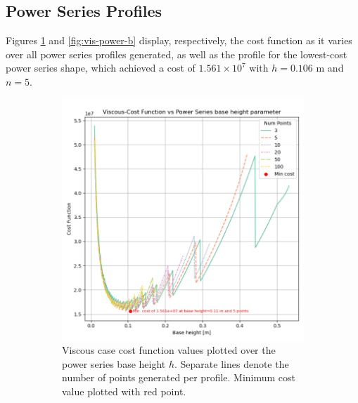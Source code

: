 \documentclass[11pt]{article}
\begin{document}
\subsection{Power Series Profiles}
Figures \ref{fig:vis-power-a} and \ref{fig:vis-power-b} display, respectively, the cost function as it varies over all power series profiles generated, as well as the profile for the lowest-cost power series shape, which achieved a cost of $1.561 \times 10^7$ with $h=0.106 \text{ m}$ and $n=5$.
\begin{figure}[H]
\centering
\begin{subfigure}[b]{0.45\textwidth}
    \centering
    \includegraphics[width=\linewidth]{../results/viscous/power_series.png}
    \caption{Viscous case cost function values plotted over the power series base height $h$. Separate lines denote the number of points generated per profile. Minimum cost value plotted with red point.}
    \label{fig:vis-power-a}
\end{subfigure}
\hfill
\begin{subfigure}[b]{0.45\textwidth}
    \centering

\end{subfigure}
\end{figure}
\end{document}
